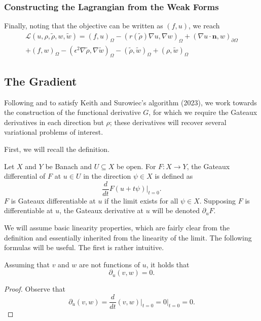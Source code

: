 \subsubsection{Constructing the Lagrangian from the Weak Forms}
Finally, noting that the objective can be written as $(f, u)$, we reach
\begin{multline}\label{eq:full_lagrangian}
    \mathcal{L}(u, \rho, \tilde{\rho}, w, \tilde{w}) = (f,u)_\Omega - (r(\tilde{\rho}) \nabla u, \nabla w)_\Omega + (\nabla u \cdot \mathbf{n}, w)_{\partial\Omega}\\
        + (f,w)_\Omega - (\epsilon^2 \nabla\tilde{\rho}, \nabla\tilde{w})_\Omega - (\tilde{\rho}, \tilde{w})_\Omega + (\rho, \tilde{w})_\Omega
\end{multline}

\subsection{The Gradient}

Following \cite{ghattas_willcox_2021} and to satisfy Keith and Surowiec's algorithm (2023), we work
towards the construction of the functional derivative $G$, for which we require the Gateaux derivatives
in each direction but $\rho$; these derivatives will recover several variational problems of interest.

First, we will recall the definition.

\begin{definition}
    Let $X$ and $Y$ be Banach and $U \subseteq X$ be open. For $F: X \to Y$, the Gateaux differential
    of $F$ at $u \in U$ in the direction $\psi \in X$ is defined as
    \begin{equation}
        \frac{d}{dt} F(u + t\psi) \bigg|_{t=0}.
    \end{equation}
    $F$ is Gateaux differentiable at $u$ if the limit exists for all $\psi \in X$. Supposing $F$ is
    differentiable at $u$, the Gateaux derivative at $u$ will be denoted $\partial_u F$.
\end{definition}

We will assume basic linearity properties, which are fairly clear from the definition and essentially inherited from the linearity of the limit. The
following formulas will be useful. The first is rather intuitive.

\begin{lemma}\label{lem:zero_gateaux}
    Assuming that $v$ and $w$ are not functions of $u$, it holds that
    \begin{equation}
        \partial_u (v, w) = 0.
    \end{equation}
\end{lemma}
\begin{proof}
    Observe that
    \begin{equation*}
        \partial_u (v,w) = \frac{d}{dt} (v,w) \bigg|_{t=0} = 0 |_{t=0} = 0.
    \end{equation*}
\end{proof}

